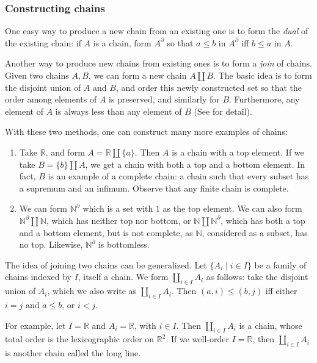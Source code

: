 \documentclass[12pt]{article}
\begin{document}
\subsubsection*{Constructing chains}

One easy way to produce a new chain from an existing one is to form the \emph{dual} of the existing chain: if $A$ is a chain, form $A^{\partial}$ so that $a\le b$ in $A^{\partial}$ iff $b\le a$ in $A$.

Another way to produce new chains from existing ones is to form a \emph{join} of chains.  Given two chains $A,B$, we can form a new chain $A\coprod B$.  The basic idea is to form the disjoint union of $A$ and $B$, and order this newly constructed set so that the order among elements of $A$ is preserved, and similarly for $B$.  Furthermore, any element of $A$ is always less than any element of $B$ (See  for detail).

With these two methods, one can construct many more examples of chains:
\begin{enumerate}
\item Take $\mathbb{R}$, and form $A=\mathbb{R}\coprod \lbrace a\rbrace$.  Then $A$ is a chain with a top element.  If we take $B=\lbrace b\rbrace \coprod A$, we get a chain with both a top and a bottom element.  In fact, $B$ is an example of a complete chain: a chain such that every subset has a supremum and an infimum.  Observe that any finite chain is complete.
\item We can form $\mathbb{N}^{\partial}$ which is a set with $1$ as the top element.  We can also form $\mathbb{N}^{\partial}\coprod \mathbb{N}$, which has neither top nor bottom, or $\mathbb{N}\coprod \mathbb{N}^{\partial}$, which has both a top and a bottom element, but is not complete, as $\mathbb{N}$, considered as a subset, has no top.  Likewise, $\mathbb{N}^{\partial}$ is bottomless.
\end{enumerate}

The idea of joining two chains can be generalized.  Let $\lbrace A_i\mid i\in I\rbrace$ be a family of chains indexed by $I$, itself a chain.  We form $\coprod_{i\in I} A_i$ as follows: take the disjoint union of $A_i$, which we also write as $\coprod_{i\in I} A_i$.  Then $(a,i)\le (b,j)$ iff either $i=j$ and $a\le b$, or $i<j$.

For example, let $I=\mathbb{R}$ and $A_i=\mathbb{R}$, with $i\in I$.  Then $\coprod_{i\in I}A_i$ is a chain, whose total order is the lexicographic order on $\mathbb{R}^2$.  If we well-order $I=\mathbb{R}$, then $\coprod_{i\in I}A_i$ is another chain called the long line.
\end{document}
